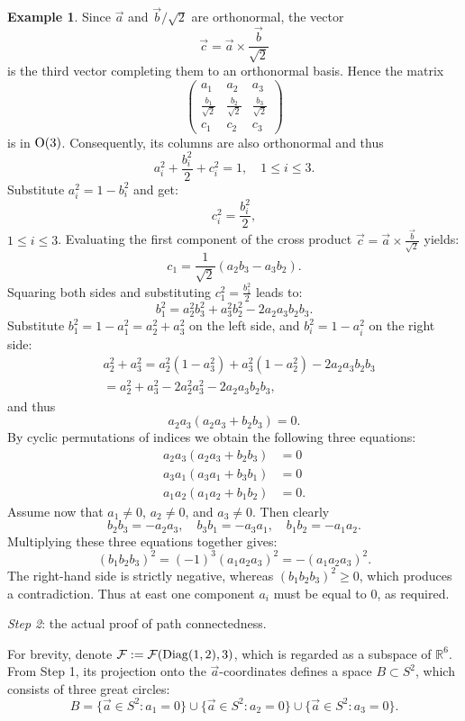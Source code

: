 \documentclass[12pt]{amsart}
\theoremstyle{definition}
\newtheorem{ex}[thm]{Example}
\theoremstyle{remark}
\begin{document}
\begin{ex}
Since $\vec{a}$ and $\vec{b}/\sqrt{2}$ are orthonormal, the vector
\[
\vec{c} = \vec{a} \times \frac{\vec{b}}{\sqrt{2}}
\]
is the third vector completing them to an orthonormal basis.
Hence the matrix
\[
\begin{pmatrix}
a_1 & a_2 & a_3 \\
\frac{b_1}{\sqrt{2}} & \frac{b_2}{\sqrt{2}} & \frac{b_3}{\sqrt{2}} \\
c_1 & c_2 & c_3
\end{pmatrix}
\]
is in ${\rm O}(3)$.
 Consequently, its columns are also  orthonormal and thus
\[
a_i^2 + \frac{b_i^2}{2} + c_i^2 = 1, \quad 1\le i \le 3.
\]
Substitute  $a_i^2=1-b_i^2$ and  get:
\[
c_i^2  = \frac{b_i^2}{2},
\]
$1\le i \le 3$. 
Evaluating the first component of the cross product $\vec{c} = \vec{a} \times \frac{\vec{b}}{\sqrt{2}}$ yields:
\[
c_1 = \frac{1}{\sqrt{2}}(a_2 b_3 - a_3 b_2).
\]
Squaring both sides and substituting $c_1^2 = \frac{b_1^2}{2}$ leads to:
\[
 b_1^2 = a_2^2 b_3^2 + a_3^2 b_2^2 - 2a_2 a_3 b_2 b_3.
\]
Substitute $b_1^2 = 1 - a_1^2 = a_2^2 + a_3^2$ on the left side, and $b_i^2 = 1 - a_i^2$ on the right side:
\begin{align*}{}&
a_2^2 + a_3^2 = a_2^2(1 - a_3^2) + a_3^2(1 - a_2^2) - 2a_2 a_3 b_2 b_3\\
{}& = a_2^2 + a_3^2 - 2a_2^2 a_3^2 - 2a_2 a_3 b_2 b_3,
\end{align*}
and thus 
\[
 a_2 a_3(a_2 a_3 + b_2 b_3) = 0.
\]
By cyclic permutations of indices  we obtain the following three equations:
\begin{align*}
    a_2 a_3(a_2 a_3 + b_2 b_3) &= 0 \\
    a_3 a_1(a_3 a_1 + b_3 b_1) &= 0 \\
    a_1 a_2(a_1 a_2 + b_1 b_2) &= 0.
\end{align*}
Assume now that $a_1 \neq 0$, $a_2 \neq 0$, and $a_3 \neq 0$. Then clearly
\[
b_2 b_3 = -a_2 a_3, \quad b_3 b_1 = -a_3 a_1, \quad b_1 b_2 = -a_1 a_2.
\]
Multiplying these three equations together gives:
\[
(b_1 b_2 b_3)^2 = (-1)^3 (a_1 a_2 a_3)^2 = 
-(a_1 a_2 a_3)^2.
\]
The right-hand side is strictly negative, whereas  $(b_1 b_2 b_3)^2 \ge 0$, which produces a contradiction. 
Thus at east one component $a_i$ must be equal to $0$, as required.


 {\it Step 2}: the actual proof of  path connectedness.


For brevity, denote  ${\mathcal F}:={\mathcal F}({\rm Diag}(1,2), 3)$, which is regarded as a subspace of  $\mathbb{R}^6$. From Step 1, its projection  onto the $\vec{a}$-coordinates defines a space $B \subset S^2$, which consists of three  great circles:
\[
B = \{ \vec{a} \in S^2 : a_1=0 \} \cup \{ \vec{a} \in S^2 : a_2=0 \} \cup \{ \vec{a} \in S^2 : a_3=0 \}.
\]


\end{ex}
\end{document}
